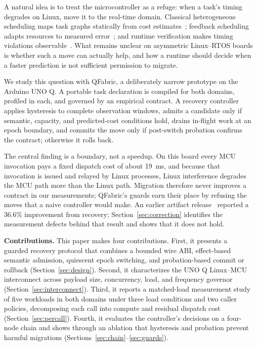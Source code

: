 \documentclass[conference]{IEEEtran}
\newcommand{\system}{QFabric\xspace}
\begin{document}
A natural idea is to treat the microcontroller as a refuge: when a task's
timing degrades on Linux, move it to the real-time domain. Classical
heterogeneous scheduling maps task graphs statically from cost
estimates~\cite{topcuoglu2002heft}; feedback scheduling adapts resources to
measured error~\cite{lu2002feedback}; and runtime verification makes timing
violations observable~\cite{reinbacher2014runtime,nandi2015contracts}. What
remains unclear on asymmetric Linux--RTOS boards is whether such a move can
actually help, and how a runtime should decide when a faster prediction is not
sufficient permission to migrate.

We study this question with \system, a deliberately narrow prototype on the
Arduino UNO Q. A portable task declaration is compiled for both domains,
profiled in each, and governed by an empirical contract. A recovery controller
applies hysteresis to complete observation windows, admits a candidate only if
semantic, capacity, and predicted-cost conditions hold, drains in-flight work
at an epoch boundary, and commits the move only if post-switch probation
confirms the contract; otherwise it rolls back.

The central finding is a boundary, not a speedup. On this board every MCU
invocation pays a fixed dispatch cost of about 19~ms, and because that
invocation is issued and relayed by Linux processes, Linux interference
degrades the MCU path more than the Linux path. Migration therefore never
improves a contract in our measurements; \system's guards earn their place by
refusing the moves that a naive controller would make. An earlier artifact
release~\cite{qfabric2026v101} reported a 36.6\% improvement from recovery;
Section~\ref{sec:correction} identifies the measurement defects behind that
result and shows that it does not hold.

\textbf{Contributions.} This paper makes four contributions. First, it
presents a guarded recovery protocol that combines a bounded wire ABI,
effect-based semantic admission, quiescent epoch switching, and
probation-based commit or rollback (Section~\ref{sec:design}). Second, it
characterizes the UNO Q Linux--MCU interconnect across payload size,
concurrency, load, and frequency governor (Section~\ref{sec:interconnect}).
Third, it reports a matched-load measurement study of five workloads in both
domains under three load conditions and two caller policies, decomposing each
call into compute and residual dispatch cost (Section~\ref{sec:percall}).
Fourth, it evaluates the controller's decisions on a four-node chain and shows
through an ablation that hysteresis and probation prevent harmful migrations
(Sections~\ref{sec:chain}--\ref{sec:guards}).
\end{document}
